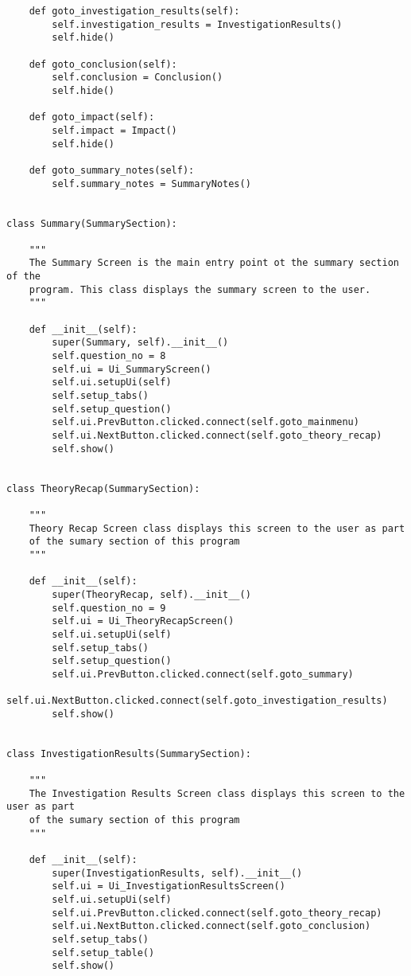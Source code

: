 \documentclass{article}
\begin{document}
\begin{lstlisting}
    def goto_investigation_results(self):
        self.investigation_results = InvestigationResults()
        self.hide()

    def goto_conclusion(self):
        self.conclusion = Conclusion()
        self.hide()

    def goto_impact(self):
        self.impact = Impact()
        self.hide()

    def goto_summary_notes(self):
        self.summary_notes = SummaryNotes()


class Summary(SummarySection):

    """
    The Summary Screen is the main entry point ot the summary section of the
    program. This class displays the summary screen to the user.
    """

    def __init__(self):
        super(Summary, self).__init__()
        self.question_no = 8
        self.ui = Ui_SummaryScreen()
        self.ui.setupUi(self)
        self.setup_tabs()
        self.setup_question()
        self.ui.PrevButton.clicked.connect(self.goto_mainmenu)
        self.ui.NextButton.clicked.connect(self.goto_theory_recap)
        self.show()


class TheoryRecap(SummarySection):

    """
    Theory Recap Screen class displays this screen to the user as part
    of the sumary section of this program
    """

    def __init__(self):
        super(TheoryRecap, self).__init__()
        self.question_no = 9
        self.ui = Ui_TheoryRecapScreen()
        self.ui.setupUi(self)
        self.setup_tabs()
        self.setup_question()
        self.ui.PrevButton.clicked.connect(self.goto_summary)
        self.ui.NextButton.clicked.connect(self.goto_investigation_results)
        self.show()


class InvestigationResults(SummarySection):

    """
    The Investigation Results Screen class displays this screen to the user as part
    of the sumary section of this program
    """

    def __init__(self):
        super(InvestigationResults, self).__init__()
        self.ui = Ui_InvestigationResultsScreen()
        self.ui.setupUi(self)
        self.ui.PrevButton.clicked.connect(self.goto_theory_recap)
        self.ui.NextButton.clicked.connect(self.goto_conclusion)
        self.setup_tabs()
        self.setup_table()
        self.show()


\end{lstlisting}
\end{document}
